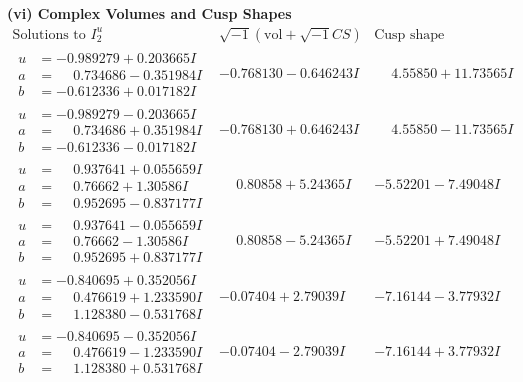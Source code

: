 \documentclass[1p]{elsarticle_modified}
\theoremstyle{definition}
\newcommand{\I}{\sqrt{-1}}
\begin{document}
\newpage\flushleft \textbf{(vi) Complex Volumes and Cusp Shapes}
$$\begin{array}{c|c|c}  
\text{Solutions to }I^u_{2}& \I (\text{vol} + \sqrt{-1}CS) & \text{Cusp shape}\\
 \hline 
\begin{aligned}
u &= -0.989279 + 0.203665 I \\
a &= \phantom{-}0.734686 - 0.351984 I \\
b &= -0.612336 + 0.017182 I\end{aligned}
 & -0.768130 - 0.646243 I & \phantom{-}4.55850 + 11.73565 I \\ \hline\begin{aligned}
u &= -0.989279 - 0.203665 I \\
a &= \phantom{-}0.734686 + 0.351984 I \\
b &= -0.612336 - 0.017182 I\end{aligned}
 & -0.768130 + 0.646243 I & \phantom{-}4.55850 - 11.73565 I \\ \hline\begin{aligned}
u &= \phantom{-}0.937641 + 0.055659 I \\
a &= \phantom{-}0.76662 + 1.30586 I \\
b &= \phantom{-}0.952695 - 0.837177 I\end{aligned}
 & \phantom{-}0.80858 + 5.24365 I & -5.52201 - 7.49048 I \\ \hline\begin{aligned}
u &= \phantom{-}0.937641 - 0.055659 I \\
a &= \phantom{-}0.76662 - 1.30586 I \\
b &= \phantom{-}0.952695 + 0.837177 I\end{aligned}
 & \phantom{-}0.80858 - 5.24365 I & -5.52201 + 7.49048 I \\ \hline\begin{aligned}
u &= -0.840695 + 0.352056 I \\
a &= \phantom{-}0.476619 + 1.233590 I \\
b &= \phantom{-}1.128380 - 0.531768 I\end{aligned}
 & -0.07404 + 2.79039 I & -7.16144 - 3.77932 I \\ \hline\begin{aligned}
u &= -0.840695 - 0.352056 I \\
a &= \phantom{-}0.476619 - 1.233590 I \\
b &= \phantom{-}1.128380 + 0.531768 I\end{aligned}
 & -0.07404 - 2.79039 I & -7.16144 + 3.77932 I \\ \hline\begin{aligned}

\end{aligned}
\end{array}$$
\end{document}
